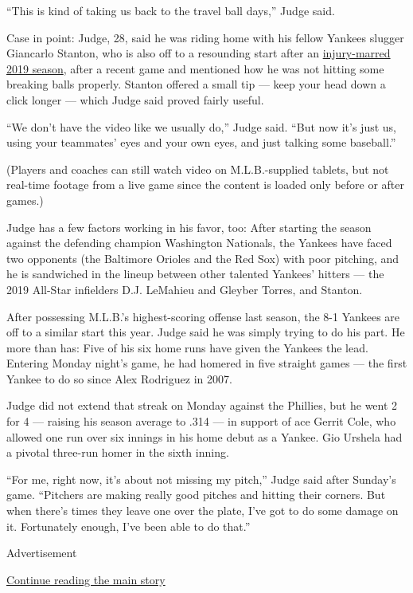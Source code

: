 ``This is kind of taking us back to the travel ball days,'' Judge said.

Case in point: Judge, 28, said he was riding home with his fellow
Yankees slugger Giancarlo Stanton, who is also off to a resounding start
after an
\href{https://www.nytimes.com/2019/09/18/sports/baseball/giancarlo-stanton-yankees.html}{injury-marred
2019 season}, after a recent game and mentioned how he was not hitting
some breaking balls properly. Stanton offered a small tip --- keep your
head down a click longer --- which Judge said proved fairly useful.

``We don't have the video like we usually do,'' Judge said. ``But now
it's just us, using your teammates' eyes and your own eyes, and just
talking some baseball.''

(Players and coaches can still watch video on M.L.B.-supplied tablets,
but not real-time footage from a live game since the content is loaded
only before or after games.)

Judge has a few factors working in his favor, too: After starting the
season against the defending champion Washington Nationals, the Yankees
have faced two opponents (the Baltimore Orioles and the Red Sox) with
poor pitching, and he is sandwiched in the lineup between other talented
Yankees' hitters --- the 2019 All-Star infielders D.J. LeMahieu and
Gleyber Torres, and Stanton.

After possessing M.L.B.'s highest-scoring offense last season, the 8-1
Yankees are off to a similar start this year. Judge said he was simply
trying to do his part. He more than has: Five of his six home runs have
given the Yankees the lead. Entering Monday night's game, he had homered
in five straight games --- the first Yankee to do so since Alex
Rodriguez in 2007.

Judge did not extend that streak on Monday against the Phillies, but he
went 2 for 4 --- raising his season average to .314 --- in support of
ace Gerrit Cole, who allowed one run over six innings in his home debut
as a Yankee. Gio Urshela had a pivotal three-run homer in the sixth
inning.

``For me, right now, it's about not missing my pitch,'' Judge said after
Sunday's game. ``Pitchers are making really good pitches and hitting
their corners. But when there's times they leave one over the plate,
I've got to do some damage on it. Fortunately enough, I've been able to
do that.''

Advertisement

\protect\hyperlink{after-bottom}{Continue reading the main story}

